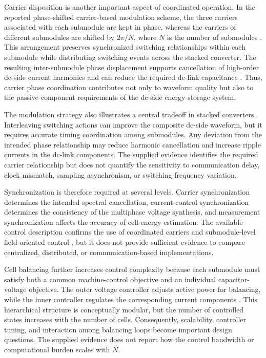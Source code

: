 Carrier disposition is another important aspect of coordinated operation. In the reported phase-shifted carrier-based modulation scheme, the three carriers associated with each submodule are kept in phase, whereas the carriers of different submodules are shifted by \(2\pi/N\), where \(N\) is the number of submodules \cite{Jin2017}. This arrangement preserves synchronized switching relationships within each submodule while distributing switching events across the stacked converter. The resulting inter-submodule phase displacement supports cancellation of high-order dc-side current harmonics and can reduce the required dc-link capacitance \cite{Jin2017}. Thus, carrier phase coordination contributes not only to waveform quality but also to the passive-component requirements of the dc-side energy-storage system.

The modulation strategy also illustrates a central tradeoff in stacked converters. Interleaving switching actions can improve the composite dc-side waveform, but it requires accurate timing coordination among submodules. Any deviation from the intended phase relationship may reduce harmonic cancellation and increase ripple currents in the dc-link components. The supplied evidence identifies the required carrier relationship but does not quantify the sensitivity to communication delay, clock mismatch, sampling asynchronism, or switching-frequency variation. %

Synchronization is therefore required at several levels. Carrier synchronization determines the intended spectral cancellation, current-control synchronization determines the consistency of the multiphase voltage synthesis, and measurement synchronization affects the accuracy of cell-energy estimation. The available control description confirms the use of coordinated carriers and submodule-level field-oriented control \cite{Jin2017}, but it does not provide sufficient evidence to compare centralized, distributed, or communication-based implementations. %

Cell balancing further increases control complexity because each submodule must satisfy both a common machine-control objective and an individual capacitor-voltage objective. The outer voltage controller adjusts active power for balancing, while the inner controller regulates the corresponding current components \cite{Jin2017}. This hierarchical structure is conceptually modular, but the number of controlled states increases with the number of cells. Consequently, scalability, controller tuning, and interaction among balancing loops become important design questions. The supplied evidence does not report how the control bandwidth or computational burden scales with \(N\). %


